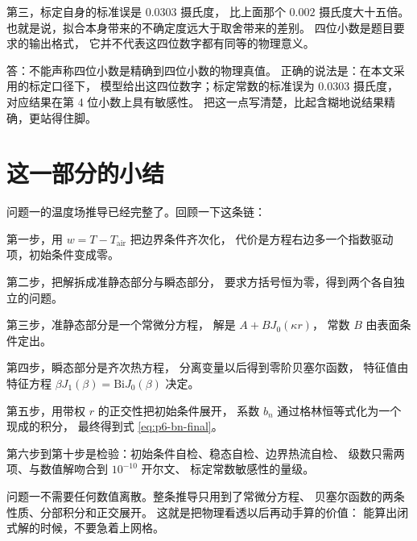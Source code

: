 第三，标定自身的标准误是 $0.0303$ 摄氏度，
比上面那个 $0.002$ 摄氏度大十五倍。
也就是说，拟合本身带来的不确定度远大于取舍带来的差别。
四位小数是题目要求的输出格式，
它并不代表这四位数字都有同等的物理意义。

答：不能声称四位小数是精确到四位小数的物理真值。
正确的说法是：在本文采用的标定口径下，
模型给出这四位数字；标定常数的标准误为 $0.0303$ 摄氏度，
对应结果在第 4 位小数上具有敏感性。
把这一点写清楚，比起含糊地说结果精确，更站得住脚。

\section{这一部分的小结}

问题一的温度场推导已经完整了。回顾一下这条链：

第一步，用 $w=T-T_{\mathrm{air}}$ 把边界条件齐次化，
代价是方程右边多一个指数驱动项，初始条件变成零。

第二步，把解拆成准静态部分与瞬态部分，
要求方括号恒为零，得到两个各自独立的问题。

第三步，准静态部分是一个常微分方程，
解是 $A+BJ_0(\kappa r)$，
常数 $B$ 由表面条件定出。

第四步，瞬态部分是齐次热方程，
分离变量以后得到零阶贝塞尔函数，
特征值由特征方程 $\beta J_1(\beta)=\mathrm{Bi}J_0(\beta)$ 决定。

第五步，用带权 $r$ 的正交性把初始条件展开，
系数 $b_n$ 通过格林恒等式化为一个现成的积分，
最终得到式 \eqref{eq:p6-bn-final}。

第六步到第十步是检验：初始条件自检、稳态自检、边界热流自检、
级数只需两项、与数值解吻合到 $10^{-10}$ 开尔文、
标定常数敏感性的量级。

\begin{keypoint}
问题一不需要任何数值离散。整条推导只用到了常微分方程、
贝塞尔函数的两条性质、分部积分和正交展开。
这就是把物理看透以后再动手算的价值：
能算出闭式解的时候，不要急着上网格。
\end{keypoint}
